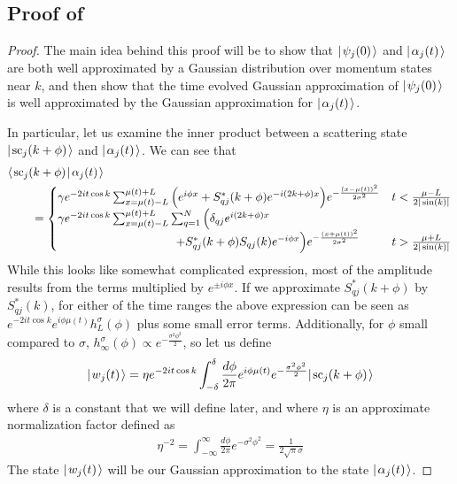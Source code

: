 \documentclass[../thesis-main/thesis-main]{subfiles}
\begin{document}
\subsection{Proof of }


\begin{proof}



The main idea behind this proof will be to show that $|\mspace{2mu} \psi_j(0) \mspace{2mu} \rangle$ and $|\mspace{2mu} \alpha_j(t) \mspace{2mu} \rangle$ are both well approximated by a Gaussian distribution over momentum states near $k$, and then show that the time evolved Gaussian approximation of $|\mspace{2mu} \psi_j(0) \mspace{2mu} \rangle$ is well approximated by the Gaussian approximation for $|\mspace{2mu} \alpha_j(t) \mspace{2mu} \rangle$.  

In particular, let us examine the inner product between a scattering state $|\mspace{2mu} \text{sc}_j(k+\phi) \mspace{2mu} \rangle$ and $|\mspace{2mu} \alpha_j(t) \mspace{2mu} \rangle$.  We can see that
\begin{align}
  &\langle\mspace{2mu} \text{sc}_j(k+\phi) \mspace{2mu} | \mspace{2mu} \alpha_j(t)\mspace{2mu} \rangle\nonumber\\
  &\qquad= \begin{cases} 
      \gamma e^{-2 i t \cos k} \sum_{x=\mu(t)-L}^{\mu(t)+L} \Big(e^{i \phi x} + S_{qj}^*(k+\phi) e^{-i(2k + \phi)x}\Big) e^{ -\frac{(x-\mu(t))^2}{2\sigma^2}}
        & t < \frac{\mu - L}{2|\sin(k)|}\\
      \gamma e^{-2 i t \cos k} \sum_{x=\mu(t)-L}^{\mu(t)+L} \sum_{q=1}^N \Big(\delta_{qj} e^{i (2k+\phi) x}\\
      \qquad \qquad \qquad \qquad\qquad  + S_{qj}^*(k+\phi) S_{qj}(k) e^{-i\phi x}\Big) e^{ -\frac{(x+\mu(t))^2}{2\sigma^2}}& t > \frac{\mu + L}{2|\sin(k)|}
      \end{cases} 
 \end{align}
While this looks like somewhat complicated expression, most of the amplitude results from the terms multiplied by $e^{\pm i \phi x}$.  If we approximate $S_{qj}^*(k+\phi)$ by $S_{qj}^*(k)$, for either of the time ranges the above expression can be seen as $e^{-2it \cos k} e^{ i \phi \mu(t)} h_L^\sigma(\phi)$ plus some small error terms.  Additionally, for $\phi$ small compared to $\sigma$, $h_\infty^\sigma(\phi) \propto e^{-\frac{\sigma^2\phi^2}{2}}$,  so let us define
\begin{align}
  |\mspace{2mu} w_j(t) \mspace{2mu} \rangle = \eta e^{- 2 i t \cos k}\int_{-\delta}^{\delta} \frac{d\phi}{2\pi} e^{ i \phi \mu(t)} e^{-\frac{\sigma^2\phi^2}{2}}|\mspace{2mu} \text{sc}_{j}(k+\phi) \mspace{2mu} \rangle \label{eq:gaussian_w_defn}
\end{align}
where $\delta$ is a constant that we will define later, and where $\eta$ is an approximate normalization factor defined as
\begin{align}
  \eta^{-2} = \int_{-\infty}^{\infty} \frac{d\phi}{2\pi} e^{-\sigma^2\phi^2} = \frac{1}{2 \sqrt{\pi} \sigma}
\end{align}
The state $|\mspace{2mu} w_j(t) \mspace{2mu} \rangle$ will be our Gaussian approximation to the state $|\mspace{2mu} \alpha_j(t) \mspace{2mu} \rangle$.  


\end{proof}
\end{document}
